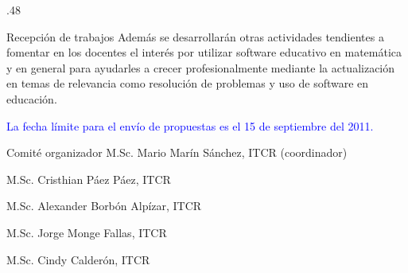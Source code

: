 \documentclass[x11names,table,usenames,dvipsnames]{beamer}
\begin{document}
\begin{frame}[plain]{}
\begin{columns}[t]
\begin{column}{.48\linewidth}
\begin{block}{Recepción de trabajos}
Además se desarrollarán otras actividades tendientes a fomentar en los docentes el interés por utilizar software educativo en matemática y en general para ayudarles a crecer profesionalmente mediante la actualización en temas de relevancia como resolución de problemas y uso de software en educación.

\textcolor{Blue}{La fecha límite para el envío de propuestas es el 15  de septiembre del 2011.}
        \end{block}

        \begin{block}{Comité organizador}
M.Sc. Mario Marín Sánchez, ITCR (coordinador)

M.Sc. Cristhian Páez Páez, ITCR

M.Sc. Alexander Borbón Alpízar, ITCR

M.Sc. Jorge Monge Fallas, ITCR

M.Sc. Cindy Calderón, ITCR


\end{block}
\end{column}
\end{columns}
\end{frame}
\end{document}
